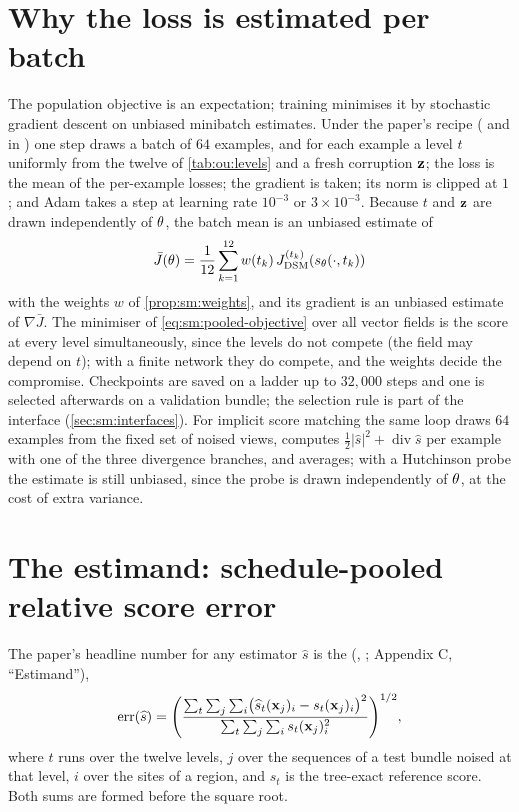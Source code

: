 \section{Why the loss is estimated per batch}
\label{sec:sm:batch}

The population objective is an expectation; training minimises it by stochastic
gradient descent on unbiased minibatch estimates. Under the paper's recipe
( and  in ) one step
draws a batch of $64$ examples, and for each example a level $t$ uniformly from the
twelve of \cref{tab:ou:levels} and a fresh corruption $\mathbf{z}$; the loss is the mean of the
per-example losses; the gradient is taken; its norm is clipped at $1$; and Adam takes a
step at learning rate $10^{-3}$ or $3\times10^{-3}$. Because $t$ and $\mathbf{z}$ are drawn
independently of $\theta$, the batch mean is an unbiased estimate of
\begin{equation}
  \bar J(\theta)=\frac1{12}\sum_{k=1}^{12}w(t_k)\,J^{(t_k)}_{\mathrm{DSM}}(s_\theta(\cdot,t_k))
  \label{eq:sm:pooled-objective}
\end{equation}
with the weights $w$ of \cref{prop:sm:weights}, and its gradient is an unbiased estimate
of $\nabla\bar J$. The minimiser of \cref{eq:sm:pooled-objective} over all vector
fields is the score at every level simultaneously, since the levels do not compete
(the field may depend on $t$); with a finite network they do compete, and the weights
decide the compromise. Checkpoints are saved on a ladder up to $32{,}000$ steps and one
is selected afterwards on a validation bundle; the selection rule is part of the
interface (\cref{sec:sm:interfaces}). For implicit score matching the same loop draws
$64$ examples from the fixed set of noised views, computes $\tfrac12|\widehat s|^2+\operatorname{div}\widehat s$
per example with one of the three divergence branches, and averages; with a Hutchinson
probe the estimate is still unbiased, since the probe is drawn independently of
$\theta$, at the cost of extra variance.

\section{The estimand: schedule-pooled relative score error}
\label{sec:sm:estimand}

\begin{definition}
\label{def:sm:estimand}
The paper's headline number for any estimator $\widehat s$ is the
 (,
; Appendix C, ``Estimand''),
\begin{equation}
  \mathrm{err}(\widehat s)=\Biggl(\frac{\sum_{t}\sum_{j}\sum_{i}\bigl(\widehat s_t(\mathbf{x}_j)_i-s_t(\mathbf{x}_j)_i\bigr)^2}
                                   {\sum_{t}\sum_{j}\sum_{i}s_t(\mathbf{x}_j)_i^2}\Biggr)^{1/2},
  \label{eq:sm:estimand}
\end{equation}
where $t$ runs over the twelve levels, $j$ over the sequences of a test bundle noised
at that level, $i$ over the sites of a region, and $s_t$ is the tree-exact reference
score. Both sums are formed before the square root.
\end{definition}

